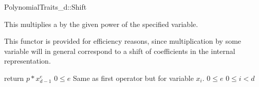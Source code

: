 \begin{ccRefConcept}{PolynomialTraits_d::Shift}
\ccDefinition

This  multiplies a  by 
the given power of the specified variable. 

This functor is provided for efficiency reasons, since multiplication by some variable 
will in general correspond to a shift of coefficients in the internal representation. 

\ccRefines 
{}

\ccTypes
{}

\ccOperations
{}
         { return $p * x_{d-1}^e$
          \ccPrecond $0 \leq e$     }
         { Same as first operator but for variable $x_i$.
          \ccPrecond $0 \leq e$   
          \ccPrecond $0 \leq i < d$
         }


\ccSeeAlso

\\
\\

\end{ccRefConcept}
